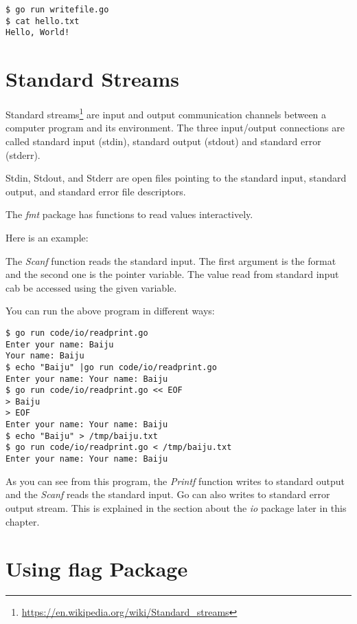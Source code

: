 \begin{lstlisting}[numbers=none]
$ go run writefile.go
$ cat hello.txt
Hello, World!
\end{lstlisting}

\section{Standard Streams}

Standard streams\footnote{\url{https://en.wikipedia.org/wiki/Standard_streams}}
are input and output communication channels between a computer program and its
environment. The three input/output connections are called standard input
(stdin), standard output (stdout) and standard error (stderr).

Stdin, Stdout, and Stderr are open files pointing to the standard input,
standard output, and standard error file descriptors.

The \textit{fmt} package has functions to read values
interactively.

Here is an example:



The \textit{Scanf} function reads the standard input. The first argument is the
format and the second one is the pointer variable. The value read from standard
input cab be accessed using the given variable.

You can run the above program in different ways:

\begin{lstlisting}[numbers=none]
$ go run code/io/readprint.go
Enter your name: Baiju
Your name: Baiju
$ echo "Baiju" |go run code/io/readprint.go
Enter your name: Your name: Baiju
$ go run code/io/readprint.go << EOF
> Baiju
> EOF
Enter your name: Your name: Baiju
$ echo "Baiju" > /tmp/baiju.txt
$ go run code/io/readprint.go < /tmp/baiju.txt
Enter your name: Your name: Baiju
\end{lstlisting}

As you can see from this program, the \textit{Printf} function writes to
standard output and the \textit{Scanf} reads the standard input. Go can also
writes to standard error output stream. This is explained in the section about
the \textit{io} package later in this chapter.

\section{Using flag Package}


